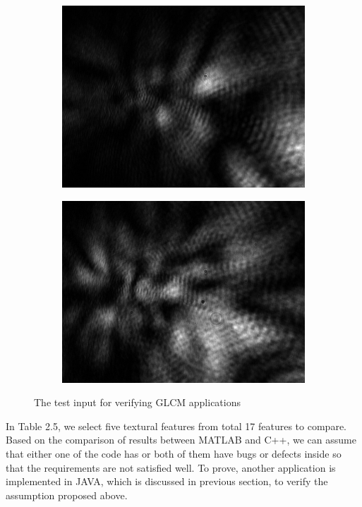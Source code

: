 \begin{figure}[!b]
\begin{subfigure}[b]{0.5\textwidth}
    \includegraphics[width=\textwidth]{PicA1002}
    \caption{}
  \end{subfigure}
  \begin{subfigure}[b]{0.5\textwidth}
    \includegraphics[width=\textwidth]{PicA1003}
    \caption{}
  \end{subfigure}
  \caption{The test input for verifying GLCM applications}
\end{figure}
In Table 2.5, we select five textural features from total 17 features to compare. Based on the comparison of results between MATLAB and C++, we can assume that either one of the code has or both of them have bugs or defects inside so that the requirements are not satisfied well. To prove, another application is implemented in JAVA, which is discussed in previous section, to verify the assumption proposed above. 
